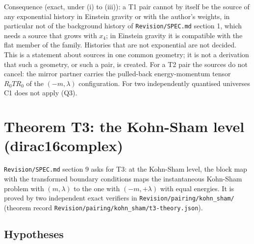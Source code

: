 \documentclass[11pt]{article}
\begin{document}
Consequence (exact, under (i) to (iii)): a T1 pair cannot by itself be the source of any exponential history in Einstein gravity or with the author's weights, in particular not of the background history of \texttt{Revision\allowbreak{}/SPEC.md} section 1, which needs a source that grows with $x_4$; in Einstein gravity it is compatible with the flat member of the family. Histories that are not exponential are not decided. This is a statement about sources in one common geometry; it is not a derivation that such a geometry, or such a pair, is created. For a T2 pair the sources do not cancel: the mirror partner carries the pulled-back energy-momentum tensor $R_0TR_0$ of the $(-m,\lambda)$ configuration. For two independently quantised universes C1 does not apply (Q3).

\section{Theorem T3: the Kohn-Sham level (dirac16complex)}

\texttt{Revision\allowbreak{}/SPEC.md} section 9 asks for T3: at the Kohn-Sham level, the block map with the transformed boundary conditions maps the instantaneous Kohn-Sham problem with $(m,\lambda)$ to the one with $(-m,+\lambda)$ with equal energies. It is proved by two independent exact verifiers in \texttt{Revision\allowbreak{}/pairing\allowbreak{}/kohn\_sh\allowbreak{}am/} (theorem record \texttt{Revision\allowbreak{}/pairing\allowbreak{}/kohn\_sh\allowbreak{}am/t3-th\allowbreak{}eory.jso\allowbreak{}n}).

\subsection{Hypotheses}
\end{document}
